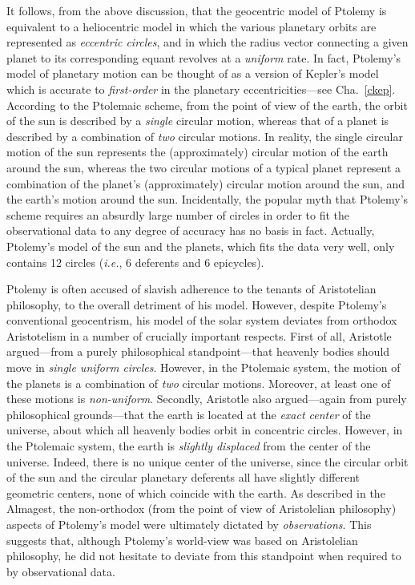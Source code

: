 It follows, from the above discussion, that the geocentric model of Ptolemy is equivalent to a heliocentric
model in which the various planetary orbits are represented as
{\em eccentric circles}, and in which   the radius vector connecting a given planet
to its corresponding equant revolves at a {\em uniform}\/ rate. In fact, Ptolemy's
model of planetary motion can be thought of as a version of Kepler's model which
is  accurate to {\em first-order}\/ in the planetary eccentricities---see Cha.~\ref{ckep}.
According to the Ptolemaic scheme, from the point of view of the earth,
the orbit of the sun is described by a {\em single}\/ circular motion, whereas
that of a planet is described by a combination of {\em two}\/ circular motions. In reality, the single circular motion of the sun 
represents the (approximately) circular motion of the earth around the sun,
whereas the two circular motions of a typical planet represent a combination of
the planet's (approximately) circular motion around the sun, and the earth's
 motion around the sun. Incidentally, the popular myth that Ptolemy's
 scheme requires an absurdly large number of circles in order to
 fit the observational data to any degree of accuracy has no basis in fact. Actually,  Ptolemy's
 model of the sun  and the planets, which fits the
 data very well, only contains 12 circles ({\em i.e.}, 6 deferents and 6 epicycles).

Ptolemy is often accused of slavish adherence to the tenants of  Aristotelian philosophy,
to the overall detriment of his model. However, despite Ptolemy's conventional geocentrism, his model of the solar system deviates from orthodox Aristotelism  in a number of crucially important respects. First of all,
Aristotle argued---from a purely philosophical standpoint---that
heavenly bodies should move in {\em single uniform circles}.
However, in the Ptolemaic system, the motion of the planets is
a combination of {\em two}\/ circular motions. Moreover, at least one
of these motions is {\em non-uniform}. Secondly, Aristotle also argued---again
from purely philosophical grounds---that the earth is located at the
{\em exact center}\/ of the universe, about which all
heavenly bodies orbit in concentric circles.  However, in  the Ptolemaic system, the earth is {\em slightly displaced}\/ from the center of the universe. 
Indeed, there is no unique center of the universe, since the circular orbit
of the sun and
the circular planetary deferents all have slightly different geometric centers,
none of which coincide with the earth. As described in the Almagest, the non-orthodox
(from the point of view of Aristolelian philosophy) 
aspects of Ptolemy's model were ultimately dictated by {\em observations}.
This suggests that, although Ptolemy's world-view was based on
Aristolelian philosophy, he did not hesitate to deviate from this standpoint
when required to by observational data.

